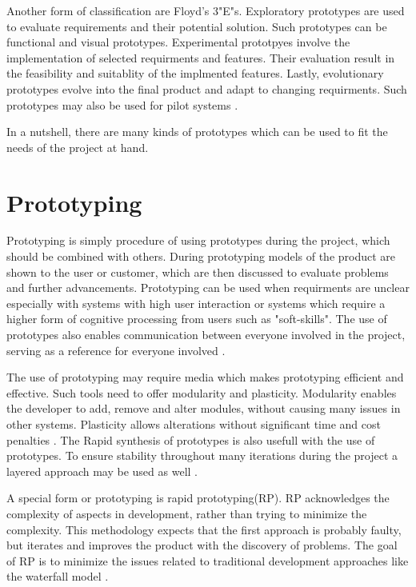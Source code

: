 \documentclass[runningheads]{llncs}
\begin{document}
Another form of classification are Floyd's 3"E"s.
Exploratory prototypes are used to evaluate requirements and their potential solution. Such prototypes can be functional and 
visual prototypes.
Experimental prototpyes involve the implementation of selected requirments and features. Their evaluation result in the feasibility
and suitablity of the implmented features.
Lastly, evolutionary prototypes evolve into the final product and adapt to changing requirments. Such prototypes may also be used for
pilot systems \cite{ref_ui}.

In a nutshell, there are many kinds of prototypes which can be used to fit the needs of the project at hand.

\section{Prototyping}
Prototyping is simply procedure of using prototypes during the project, which should be combined with others\cite{ref_prac}. 
During prototyping models of the product are shown to the user or customer, which are then discussed to evaluate problems 
and further advancements. Prototyping can be used when requirments are unclear especially with systems with high user interaction 
or systems which require a higher form of cognitive processing from users such as "soft-skills".
The use of prototypes also enables communication between everyone involved in the project, serving as a reference for everyone 
involved \cite{ref_RPInAction}.

The use of prototyping may require media which makes prototyping efficient and effective. Such tools need to offer modularity and plasticity.
Modularity enables the developer to add, remove and alter modules, without causing many issues in other systems. Plasticity allows alterations
without significant time and cost penalties \cite{ref_RPalternativeStrategy}. The Rapid synthesis of prototypes is also usefull with the use of 
prototypes\cite{ref_RPalternativeStrategy}. To ensure stability throughout many iterations during the project a layered approach may be 
used as well \cite{ref_health}.

A special form or prototyping is rapid prototyping(RP). RP acknowledges the complexity of aspects in development, rather than trying to minimize 
the complexity. This methodology expects that the first approach is probably faulty, but iterates and improves the product with the discovery of
problems. The goal of RP is to minimize the issues related to traditional development approaches like the waterfall model \cite{ref_RPalternativeStrategy}.
\end{document}

